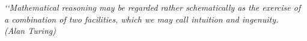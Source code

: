 \documentclass[12pt,openright,twoside,a4paper,oldfontcommands,english,brazil,final]{abntex2}
\theoremstyle{theo}
\begin{document}
\begin{epigrafe}

  \vspace*{\fill}
  \begin{flushright}
  \textit{‘‘Mathematical reasoning may be regarded
  rather schematically as the exercise of a combination of two facilities,
  which we may call intuition and ingenuity.\\
  (Alan Turing)}
  \end{flushright}

\end{epigrafe}


\end{document}
